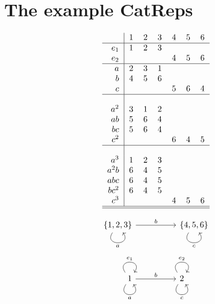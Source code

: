 
\section{The example CatReps}
\[
\begin{tabular}{r|cccccc}
   & 1 & 2 & 3 & 4 & 5 & 6 \\
\hline
$e_{1}$ & 1 & 2 & 3 &   &   &  \\
$e_{2}$ &   &   &   & 4 & 5 & 6 \\
\hline
$a$ & 2 & 3 & 1 &   &   &  \\
$b$ & 4 & 5 & 6 &   &   &  \\
$c$ &   &   &   & 5 & 6 & 4 \\
\hline
\rule{0pt}{0.01pt} \\
$a^{2}$ & 3 & 1 & 2 &   &   &  \\
$ab$ & 5 & 6 & 4 &   &   &  \\
$bc$ & 5 & 6 & 4 &   &   &  \\
$c^{2}$ &   &   &   & 6 & 4 & 5 \\
\hline
\rule{0pt}{1pt} \\
$a^{3}$ & 1 & 2 & 3 &   &   &  \\
$a^{2}b$ & 6 & 4 & 5 &   &   &  \\
$abc$ & 6 & 4 & 5 &   &   &  \\
$bc^{2}$ & 6 & 4 & 5 &   &   &  \\
$c^{3}$ &   &   &   & 4 & 5 & 6 \\
\hline
\hline
\end{tabular}
\]

\[
\begin{tikzcd}
\{1,2,3\} \arrow["a"', loop, distance=2em, in=305, out=235] \arrow[rr, "b"] &  & \{4,5,6\} \arrow["c"', loop, distance=2em, in=305, out=235]
\end{tikzcd}
\]
\[
\begin{tikzcd}
1 \arrow["a"', loop, distance=2em, in=305, out=235] \arrow["e_{1}", loop, distance=2em, in=55, out=125] \arrow[rr, "b"] & 
 & 2 \arrow["c"', loop, distance=2em, in=305, out=235] \arrow["e_{2}", loop, distance=2em, in=55, out=125]
\end{tikzcd}
\]

